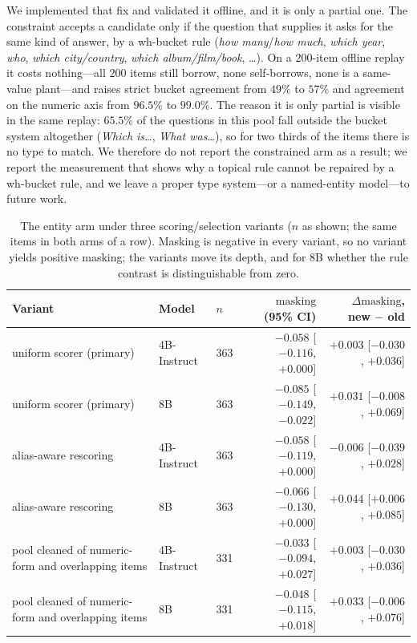 \documentclass[11pt]{article}
\newcommand{\mask}{\ensuremath{\mathrm{masking}}}
\begin{document}
We implemented that fix and validated it offline, and it is only a partial one. The constraint
accepts a candidate only if the question that supplies it asks for the same kind of answer, by
a wh-bucket rule (\emph{how many}/\emph{how much}, \emph{which year}, \emph{who},
\emph{which city/country}, \emph{which album/film/book}, \dots). On a $200$-item offline replay
it costs nothing---all $200$ items still borrow, none self-borrows, none is a same-value
plant---and raises strict bucket agreement from $49\%$ to $57\%$ and agreement on the
numeric axis from $96.5\%$ to $99.0\%$. The reason it is only partial is visible in the same
replay: $65.5\%$ of the questions in this pool fall outside the bucket system altogether
(\emph{Which is\ldots}, \emph{What was\ldots}), so for two thirds of the items there is no
type to match. We therefore do not report the constrained arm as a result; we report the
measurement that shows why a topical rule cannot be repaired by a wh-bucket rule, and we leave
a proper type system---or a named-entity model---to future work.

\begin{table}[t]\centering\small
\caption{The entity arm under three scoring/selection variants ($n$ as shown; the same items
in both arms of a row). Masking is negative in every variant, so no variant yields positive
masking; the variants move its depth, and for 8B whether the rule contrast is distinguishable
from zero.}
\label{tab:entity-robust}
\begin{tabular}{lllrr}
\toprule
Variant & Model & $n$ & \mask\ (95\% CI) & $\Delta\mask$, new $-$ old \\
\midrule
uniform scorer (primary) & 4B-Instruct & 363 & $-0.058$ [$-0.116$, $+0.000$] & $+0.003$ [$-0.030$, $+0.036$] \\
uniform scorer (primary) & 8B & 363 & $-0.085$ [$-0.149$, $-0.022$] & $+0.031$ [$-0.008$, $+0.069$] \\
alias-aware rescoring & 4B-Instruct & 363 & $-0.058$ [$-0.119$, $+0.000$] & $-0.006$ [$-0.039$, $+0.028$] \\
alias-aware rescoring & 8B & 363 & $-0.066$ [$-0.130$, $+0.000$] & $+0.044$ [$+0.006$, $+0.085$] \\
pool cleaned of numeric-form and overlapping items & 4B-Instruct & 331 & $-0.033$ [$-0.094$, $+0.027$] & $+0.003$ [$-0.030$, $+0.036$] \\
pool cleaned of numeric-form and overlapping items & 8B & 331 & $-0.048$ [$-0.115$, $+0.018$] & $+0.033$ [$-0.006$, $+0.076$] \\
\bottomrule
\end{tabular}
\end{table}
\end{document}
